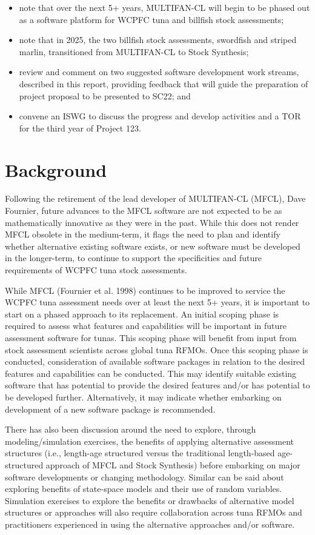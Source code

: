 \documentclass{SCreport}
\begin{document}
\begin{itemize}
  \item note that over the next 5+ years, MULTIFAN-CL will begin to be phased
  out as a software platform for WCPFC tuna and billfish stock assessments;
  \item note that in 2025, the two billfish stock assessments, swordfish and
  striped marlin, transitioned from MULTIFAN-CL to Stock Synthesis;
  \item review and comment on two suggested software development work streams,
  described in this report, providing feedback that will guide the preparation
  of project proposal to be presented to SC22; and
  \item convene an ISWG to discuss the progress and develop activities and a TOR
  for the third year of Project 123.
\end{itemize}

\section{Background}

Following the retirement of the lead developer of MULTIFAN-CL (MFCL), Dave
Fournier, future advances to the MFCL software are not expected to be as
mathematically innovative as they were in the past. While this does not render
MFCL obsolete in the medium-term, it flags the need to plan and identify whether
alternative existing software exists, or new software must be developed in the
longer-term, to continue to support the specificities and future requirements of
WCPFC tuna stock assessments.

While MFCL (Fournier et al. 1998) continues to be improved to service the WCPFC
tuna assessment needs over at least the next 5+ years, it is important to start
on a phased approach to its replacement. An initial scoping phase is required to
assess what features and capabilities will be important in future assessment
software for tunas. This scoping phase will benefit from input from stock
assessment scientists across global tuna RFMOs. Once this scoping phase is
conducted, consideration of available software packages in relation to the
desired features and capabilities can be conducted. This may identify suitable
existing software that has potential to provide the desired features and/or has
potential to be developed further. Alternatively, it may indicate whether
embarking on development of a new software package is recommended.

There has also been discussion around the need to explore, through
modeling/simulation exercises, the benefits of applying alternative assessment
structures (i.e., length-age structured versus the traditional length-based
age-structured approach of MFCL and Stock Synthesis) before embarking on major
software developments or changing methodology. Similar can be said about
exploring benefits of state-space models and their use of random variables.
Simulation exercises to explore the benefits or drawbacks of alternative model
structures or approaches will also require collaboration across tuna RFMOs and
practitioners experienced in using the alternative approaches and/or software.
\end{document}
